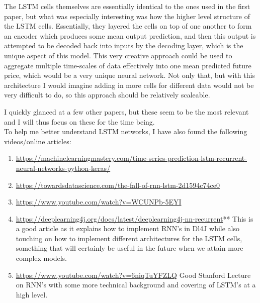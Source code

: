 \documentclass{article}
\begin{document}
\begin{enumerate}
The LSTM cells themselves are essentially identical to the ones used in the first paper, but what was especially interesting was how the higher level structure of the LSTM cells. Essentially, they layered the cells on top of one another to form an encoder which produces some mean output prediction, and then this output is attempted to be decoded back into inputs by the decoding layer, which is the unique aspect of this model. This very creative approach could be used to aggregate multiple time-scales of data effectively into one mean predicted future price, which would be a very unique neural network. Not only that, but with this architecture I would imagine adding in more cells for different data would not be very difficult to do, so this approach should be relatively scaleable. 
\end{enumerate}
I quickly glanced at a few other papers, but these seem to be the most relevant and I will thus focus on these for the time being. \\\newline 
To help me better understand LSTM networks, I have also found the following videos/online articles: \\
\begin{enumerate}
\item \href{https://machinelearningmastery.com/time-series-prediction-lstm-recurrent-neural-networks-python-keras/}{https://machinelearningmastery.com/time-series-prediction-lstm-recurrent-neural-networks-python-keras/}
\item \href{https://towardsdatascience.com/the-fall-of-rnn-lstm-2d1594c74ce0}{https://towardsdatascience.com/the-fall-of-rnn-lstm-2d1594c74ce0}
\item \href{https://www.youtube.com/watch?v=WCUNPb-5EYI}{https://www.youtube.com/watch?v=WCUNPb-5EYI}
\item \href{https://deeplearning4j.org/docs/latest/deeplearning4j-nn-recurrent}{https://deeplearning4j.org/docs/latest/deeplearning4j-nn-recurrent}** This is a good article as it explains how to implement RNN's in Dl4J while also touching on how to implement different architectures for the LSTM cells, something that will certainly be useful in the future when we attain more complex models.
\item \href{https://www.youtube.com/watch?v=6niqTuYFZLQ}{https://www.youtube.com/watch?v=6niqTuYFZLQ} Good Stanford Lecture on RNN's with some more technical background and covering of LSTM's at a high level.
\end{enumerate}
\end{document}
